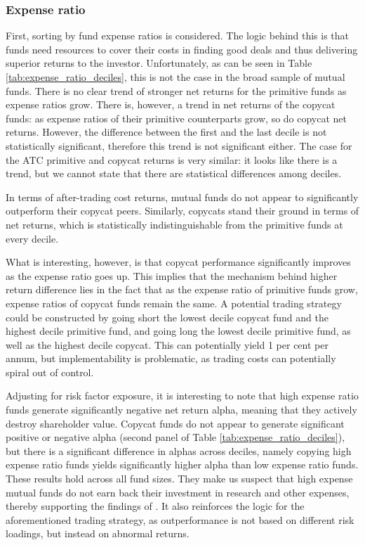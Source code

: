 \documentclass[12pt, a4]{article}
\begin{document}
\subsubsection{Expense ratio}
First, sorting by fund expense ratios is considered. The logic behind this is that funds need resources to cover their costs in finding good deals and thus delivering superior returns to the investor. Unfortunately, as can be seen in Table \ref{tab:expense_ratio_deciles}, this is not the case in the broad sample of mutual funds. There is no clear trend of stronger net returns for the primitive funds as expense ratios grow. There is, however, a trend in net returns of the copycat funds: as expense ratios of their primitive counterparts grow, so do copycat net returns. However, the difference between the first and the last decile is not statistically significant, therefore this trend is not significant either. The case for the \textsc{ATC} primitive and copycat returns is very similar: it looks like there is a trend, but we cannot state that there are statistical differences among deciles.

In terms of after-trading cost returns, mutual funds do not appear to significantly outperform their copycat peers. Similarly, copycats stand their ground in terms of net returns, which is statistically indistinguishable from the primitive funds at every decile.

What is interesting, however, is that copycat performance significantly improves as the expense ratio goes up. This implies that the mechanism behind higher return difference lies in the fact that as the expense ratio of primitive funds grow, expense ratios of copycat funds remain the same. A potential trading strategy could be constructed by going short the lowest decile copycat fund and the highest decile primitive fund, and going long the lowest decile primitive fund, as well as the highest decile copycat. This can potentially yield 1 per cent per annum, but implementability is problematic, as trading costs can potentially spiral out of control. 

Adjusting for risk factor exposure, it is interesting to note that high expense ratio funds generate significantly negative net return alpha, meaning that they actively destroy shareholder value. Copycat funds do not appear to generate significant positive or negative alpha (second panel of Table \ref{tab:expense_ratio_deciles}), but there is a significant difference in alphas across deciles, namely copying high expense ratio funds yields significantly higher alpha than low expense ratio funds. These results hold across all fund sizes. They make us suspect that high expense mutual funds do not earn back their investment in research and other expenses, thereby supporting the findings of \cite{carhart}. It also reinforces the logic for the aforementioned trading strategy, as outperformance is not based on different risk loadings, but instead on abnormal returns.
\end{document}

